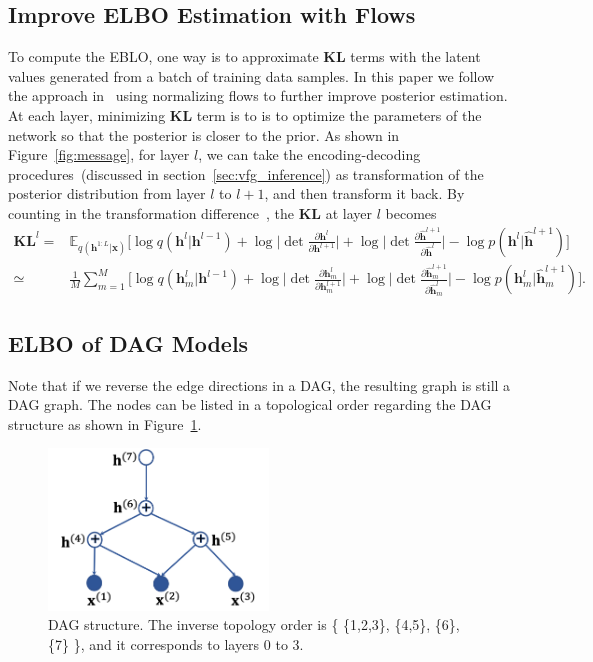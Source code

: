 \documentclass{article}
\begin{document}
\subsection{Improve ELBO Estimation with Flows}

To compute the EBLO, one way is to approximate  $\mathbf{KL}$ terms with the latent values generated from a batch of training data samples. In this paper we follow the approach in~\cite{rezende2015variational,kingma2016improving,berg2018sylvester}  using normalizing flows to further improve posterior estimation. At each layer,  minimizing  $\mathbf{KL}$ term is to is to optimize the parameters of the network so that the posterior is closer to the prior. As shown in Figure~\ref{fig:message}, for layer $l$,  we can take the  encoding-decoding procedures~(discussed in section~\ref{sec:vfg_inference}) as transformation of the posterior distribution from layer $l$ to $l+1$, and then transform it back. By  counting in the transformation difference~\cite{rezende2015variational,kingma2016improving,berg2018sylvester}, the $\mathbf{KL}$ at layer $l$ becomes 
\begin{align*}
\mathbf{KL}^l=&\mathbb{E}_{q(\mathbf{h}^{1:L}|\mathbf{x})}\bigg[  \log q(\mathbf{h}^{l}|\mathbf{h}^{l-1}) +\log \bigg|\det \frac{\partial \mathbf{h}^{l}}{\partial \mathbf{h}^{l+1}}\bigg| + \log \bigg|\det \frac{\partial \widehat{\mathbf{h}}^{l+1}}{\partial \widehat{\mathbf{h}}^{l}}\bigg|   - \log p(\mathbf{h}^{l}|\widehat{\mathbf{h}}^{l+1}) \bigg]\\
\simeq & \frac{1}{M}\sum_{m=1}^M\bigg[ \log q(\mathbf{h}^{l}_m|\mathbf{h}^{l-1}) +\log \bigg|\det \frac{\partial \mathbf{h}^{l}_m}{\partial \mathbf{h}^{l+1}_m}\bigg| + \log \bigg|\det \frac{\partial \widehat{\mathbf{h}}^{l+1}_m}{\partial \widehat{\mathbf{h}}^{l}_m}\bigg|   - \log p(\mathbf{h}^{l}_m|\widehat{\mathbf{h}}_m^{l+1}) \bigg].
\end{align*}


\subsection{ELBO of DAG Models}\label{appd:dag_elbo}
Note that if we reverse the edge directions in a DAG, the resulting graph is still a DAG graph.  
The nodes can be listed in a topological order regarding the DAG structure as shown in Figure~\ref{fig:dag}. 
\begin{figure}[H]
    \centering
    \includegraphics[width=2.3in]{fig/dag.png}
    \caption{DAG structure. The inverse topology order is \big\{ \{1,2,3\}, \{4,5\}, \{6\},  \{7\} \big\}, and it corresponds to layers 0 to 3.  }
    \label{fig:dag}
\end{figure}
\end{document}

